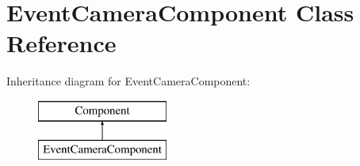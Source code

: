 \hypertarget{class_event_camera_component}{}\section{Event\+Camera\+Component Class Reference}
\label{class_event_camera_component}
Inheritance diagram for Event\+Camera\+Component\+:\begin{figure}[H]
\begin{center}
\leavevmode
\includegraphics[height=2.000000cm]{class_event_camera_component}
\end{center}
\end{figure}

